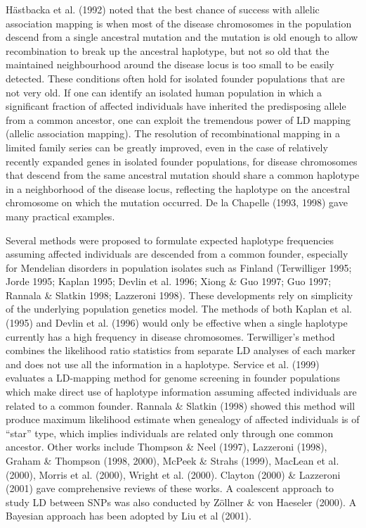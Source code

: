 H\"{a}stbacka et al.  (1992) noted that the best chance of success with allelic
association mapping is when most of the disease chromosomes in the population
descend from a single ancestral mutation and the mutation is old enough to
allow recombination to break up the ancestral haplotype, but not so old that
the maintained neighbourhood around the disease locus is too small to be easily
detected.  These conditions often hold for isolated founder populations that
are not very old.  If one can identify an isolated human population in which a
significant fraction of affected individuals have inherited the predisposing
allele from a common ancestor, one can exploit the tremendous power of LD
mapping (allelic association mapping).  The resolution of recombinational
mapping in a limited family series can be greatly improved, even in the case of
relatively recently expanded genes in isolated founder populations, for disease
chromosomes that descend from the same ancestral mutation should share a common
haplotype in a neighborhood of the disease locus, reflecting the haplotype on
the ancestral chromosome on which the mutation occurred.  De la Chapelle (1993,
1998) gave many practical examples.

Several methods were proposed to formulate expected haplotype frequencies
assuming affected individuals are descended from a common founder, especially
for Mendelian disorders in population isolates such as Finland (Terwilliger
1995; Jorde 1995; Kaplan 1995; Devlin et al.  1996; Xiong \& Guo 1997; Guo
1997; Rannala \& Slatkin 1998; Lazzeroni 1998).  These developments rely on
simplicity of the underlying population genetics model.  The methods of both
Kaplan et al.  (1995) and Devlin et al.  (1996) would only be effective when a
single haplotype currently has a high frequency in disease chromosomes.
Terwilliger's method combines the likelihood ratio statistics from separate LD
analyses of each marker and does not use all the information in a haplotype.
Service et al.  (1999) evaluates a LD-mapping method for genome screening in
founder populations which make direct use of haplotype information assuming
affected individuals are related to a common founder.  Rannala \& Slatkin
(1998) showed this method will produce maximum likelihood estimate when
genealogy of affected individuals is of ``star'' type, which implies
individuals are related only through one common ancestor.  Other works include
Thompson \& Neel (1997), Lazzeroni (1998), Graham \& Thompson (1998, 2000),
McPeek \& Strahs (1999), MacLean et al.  (2000), Morris et al.  (2000), Wright
et al.  (2000).  Clayton (2000) \& Lazzeroni (2001) gave comprehensive reviews
of these works. A coalescent approach to study LD between SNPs was also
conducted by Z\"{o}llner \& von Haeseler (2000). A Bayesian approach has been
adopted by Liu et al (2001).

